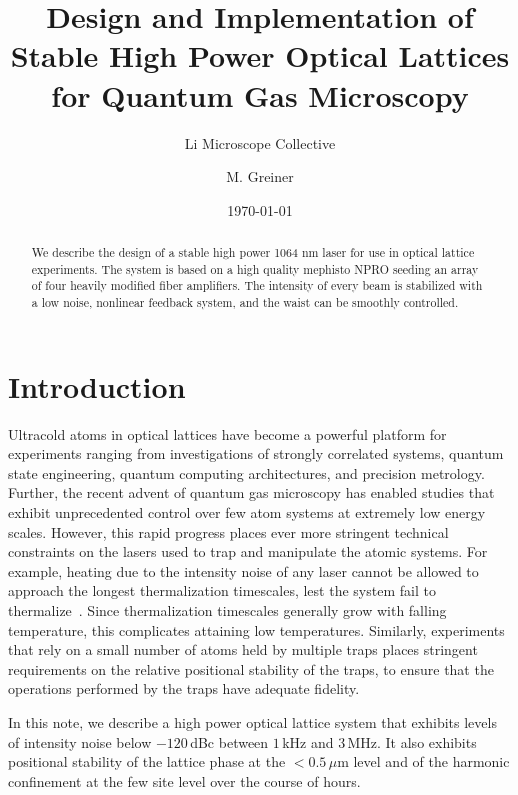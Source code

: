 \documentclass[twocolumn,aps,pra,showpacs,preprintnumbers,bibnotes]{revtex4-1}
\begin{document}
\title{Design and Implementation of Stable High Power Optical Lattices for Quantum Gas Microscopy}


\author{Li Microscope Collective}
\author{M. Greiner}

\date{\today}
\begin{abstract}
We describe the design of a stable high power 1064 nm laser for use in optical lattice experiments. The system is based on a high quality mephisto NPRO seeding an array of four heavily modified fiber amplifiers. The intensity of every beam is stabilized with a low noise, nonlinear feedback system, and the waist can be smoothly controlled. 
\end{abstract}
\maketitle

\section{Introduction}
Ultracold atoms in optical lattices have become a powerful platform for experiments ranging from investigations of strongly correlated systems, quantum state engineering, quantum computing architectures, and precision metrology.
Further, the recent advent of quantum gas microscopy has enabled studies that exhibit unprecedented control over few atom systems at extremely low energy scales.
However, this rapid progress places ever more stringent technical constraints on the lasers used to trap and manipulate the atomic systems.
For example, heating due to the intensity noise of any laser cannot be allowed to approach the longest thermalization timescales, lest the system fail to thermalize~\cite{Savard1997}. 
Since thermalization timescales generally grow with falling temperature, this complicates attaining low temperatures.
Similarly, experiments that rely on a small number of atoms held by multiple traps places stringent requirements on the relative positional stability of the traps, to ensure that the operations performed by the traps have adequate fidelity.

In this note, we describe a high power optical lattice system that exhibits levels of intensity noise below $-120\,$dBc between $1\,$kHz and $3\,$MHz.
It also exhibits positional stability of the lattice phase at the $<0.5\,\mu$m level and of the harmonic confinement at the few site level over the course of hours.
\end{document}
